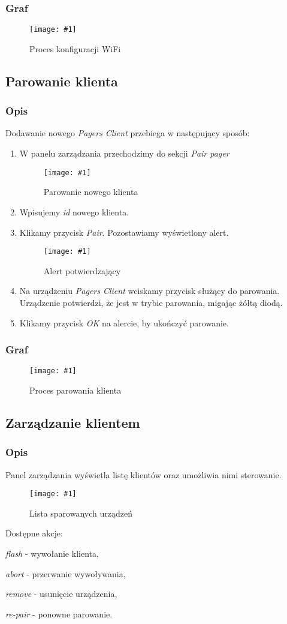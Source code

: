 \documentclass[12pt]{article}
\let\tempone\itemize
\let\temptwo\enditemize
\renewenvironment{itemize}{\tempone\setlength{\itemsep}{0cm}}{\temptwo}
\newcommand{\imgcustomsize}[3]{
	\begin{figure}[H]
		\centering
		\texttt{[image: \#1]}
		\caption{#2}
	\end{figure}
}
\newcommand{\img}[2]{\imgcustomsize{#1}{#2}{0.8}}
\begin{document}
        \subsubsection{Graf}
        \img{graphs/wifi_setup}{Proces konfiguracji WiFi}
        \pagebreak
        \subsection{Parowanie klienta}
        \subsubsection{Opis}
        Dodawanie nowego \emph{Pagers Client} przebiega w następujący sposób:
        \begin{enumerate}
            \item W panelu zarządzania przechodzimy do sekcji \emph{Pair pager}
            \img{config/pagers_pair}{Parowanie nowego klienta}
            \item Wpisujemy \emph{id} nowego klienta.
            \item Klikamy przycisk \emph{Pair}. Pozostawiamy wyświetlony alert.
            \img{config/pair_alert}{Alert potwierdzający}
            \item Na urządzeniu \emph{Pagers Client} wciskamy przycisk służący do parowania. Urządzenie potwierdzi, że jest w trybie parowania, migając żółtą diodą.
            \item Klikamy przycisk \emph{OK} na alercie, by ukończyć parowanie.
        \end{enumerate}
        \subsubsection{Graf}
        \img{graphs/pairing}{Proces parowania klienta}

        \pagebreak
        \subsection{Zarządzanie klientem}
        \subsubsection{Opis}
        Panel zarządzania wyświetla listę klientów oraz umożliwia nimi sterowanie.
        \img{config/pagers_list}{Lista sparowanych urządzeń}
        Dostępne akcje:
        \begin{itemize}
            \item \emph{flash} - wywołanie klienta,
            \item \emph{abort} - przerwanie wywoływania,
            \item \emph{remove} - usunięcie urządzenia,
            \item \emph{re-pair} - ponowne parowanie.
        \end{itemize}
\end{document}
